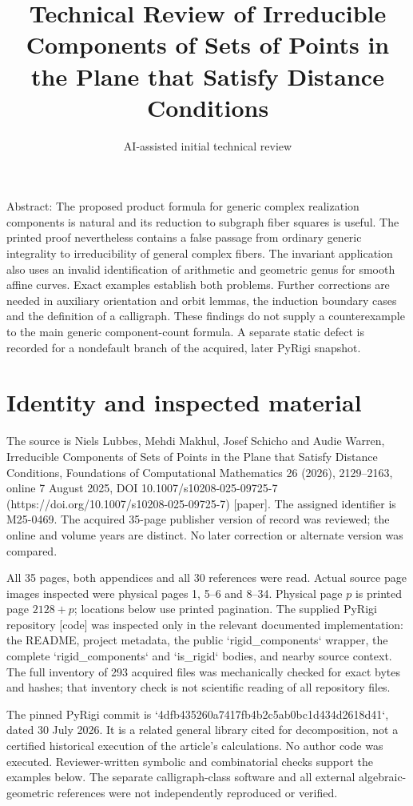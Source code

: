 \documentclass[10pt]{article}
\title{Technical Review of
Irreducible Components of Sets of Points in the Plane that Satisfy Distance Conditions}
\author{AI-assisted initial technical review}
\date{}
\begin{document}
\maketitle
Abstract: The proposed product formula for generic complex realization components is natural and its reduction to subgraph fiber squares is useful. The printed proof nevertheless contains a false passage from ordinary generic integrality to irreducibility of general complex fibers. The invariant application also uses an invalid identification of arithmetic and geometric genus for smooth affine curves. Exact examples establish both problems. Further corrections are needed in auxiliary orientation and orbit lemmas, the induction boundary cases and the definition of a calligraph. These findings do not supply a counterexample to the main generic component-count formula. A separate static defect is recorded for a nondefault branch of the acquired, later PyRigi snapshot.\par
\section*{Identity and inspected material}
The source is Niels Lubbes, Mehdi Makhul, Josef Schicho and Audie Warren, Irreducible Components of Sets of Points in the Plane that Satisfy Distance Conditions, Foundations of Computational Mathematics 26 (2026), 2129–2163, online 7 August 2025, DOI 10.1007/s10208-025-09725-7 (https://doi.org/10.1007/s10208-025-09725-7) [paper]. The assigned identifier is M25-0469. The acquired 35-page publisher version of record was reviewed; the online and volume years are distinct. No later correction or alternate version was compared.\par
All 35 pages, both appendices and all 30 references were read. Actual source page images inspected were physical pages 1, 5–6 and 8–34. Physical page \(p\) is printed page \(2128+p\); locations below use printed pagination. The supplied PyRigi repository [code] was inspected only in the relevant documented implementation: the README, project metadata, the public `rigid\_components` wrapper, the complete `rigid\_components` and `is\_rigid` bodies, and nearby source context. The full inventory of 293 acquired files was mechanically checked for exact bytes and hashes; that inventory check is not scientific reading of all repository files.\par
The pinned PyRigi commit is `4dfb435260a7417fb4b2c5ab0bc1d434d2618d41`, dated 30 July 2026. It is a related general library cited for decomposition, not a certified historical execution of the article’s calculations. No author code was executed. Reviewer-written symbolic and combinatorial checks support the examples below. The separate calligraph-class software and all external algebraic-geometric references were not independently reproduced or verified.\par
\end{document}
